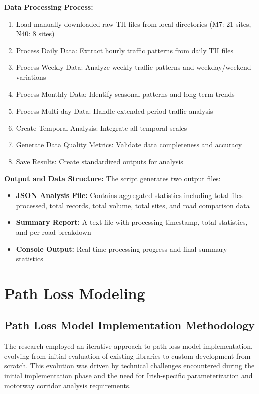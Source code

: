 \documentclass[MScCS]{uccthesis}
\begin{document}
\textbf{Data Processing Process:}
\begin{enumerate}
\item Load manually downloaded raw TII files from local directories (M7: 21 sites, N40: 8 sites)
\item Process Daily Data: Extract hourly traffic patterns from daily TII files
\item Process Weekly Data: Analyze weekly traffic patterns and weekday/weekend variations
\item Process Monthly Data: Identify seasonal patterns and long-term trends
\item Process Multi-day Data: Handle extended period traffic analysis
\item Create Temporal Analysis: Integrate all temporal scales
\item Generate Data Quality Metrics: Validate data completeness and accuracy
\item Save Results: Create standardized outputs for analysis
\end{enumerate}


\textbf{Output and Data Structure:} The script generates two output files:
\begin{itemize}
\item \textbf{JSON Analysis File:} Contains aggregated statistics including total files processed, total records, total volume, total sites, and road comparison data
\item \textbf{Summary Report:} A text file with processing timestamp, total statistics, and per-road breakdown
\item \textbf{Console Output:} Real-time processing progress and final summary statistics
\end{itemize}



\section{Path Loss Modeling}

\subsection{Path Loss Model Implementation Methodology}

The research employed an iterative approach to path loss model implementation, evolving from initial evaluation of existing libraries to custom development from scratch. This evolution was driven by technical challenges encountered during the initial implementation phase and the need for Irish-specific parameterization and motorway corridor analysis requirements.
\end{document}
